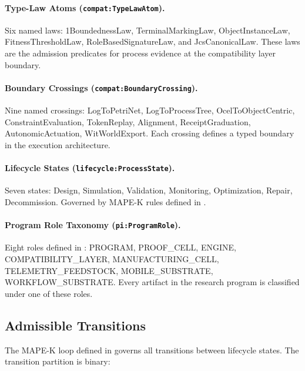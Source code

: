 \paragraph{Type-Law Atoms (\texttt{compat:TypeLawAtom}).}
Six named laws: 1BoundednessLaw, TerminalMarkingLaw, ObjectInstanceLaw, FitnessThresholdLaw,
RoleBasedSignatureLaw, and JcsCanonicalLaw. These laws are the admission predicates for
process evidence at the compatibility layer boundary.

\paragraph{Boundary Crossings (\texttt{compat:BoundaryCrossing}).}
Nine named crossings: LogToPetriNet, LogToProcessTree, OcelToObjectCentric,
ConstraintEvaluation, TokenReplay, Alignment, ReceiptGraduation, AutonomicActuation,
WitWorldExport. Each crossing defines a typed boundary in the execution architecture.

\paragraph{Lifecycle States (\texttt{lifecycle:ProcessState}).}
Seven states: Design, Simulation, Validation, Monitoring, Optimization, Repair, Decommission.
Governed by MAPE-K rules defined in .

\paragraph{Program Role Taxonomy (\texttt{pi:ProgramRole}).}
Eight roles defined in : PROGRAM, PROOF\_CELL, ENGINE,
COMPATIBILITY\_LAYER, MANUFACTURING\_CELL, TELEMETRY\_FEEDSTOCK, MOBILE\_SUBSTRATE,
WORKFLOW\_SUBSTRATE. Every artifact in the research program is classified under one of these
roles.

\subsection{Admissible Transitions}
\label{sec:research-open-ontologies-transitions}

The MAPE-K loop defined in  governs all transitions between
lifecycle states. The transition partition is binary:

